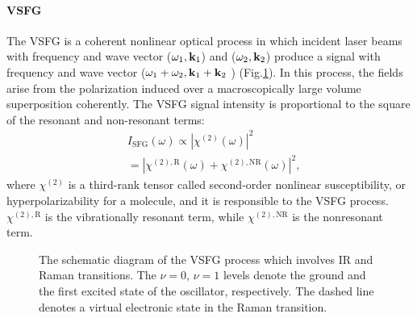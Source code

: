 \paragraph{VSFG}
The VSFG is a coherent nonlinear optical process in which incident laser beams with frequency and wave vector 
($\omega_1, {\bf k}_1$) and ($\omega_2, {\bf k}_2$) produce a signal with frequency and wave vector
($\omega_1+\omega_2, {\bf k}_1+{\bf k}_2$ ) (Fig.\thinspace\ref{fig:sfg_1a}). 
In this process, the fields arise from the polarization induced over a macroscopically large volume superposition coherently.
%
The VSFG signal intensity is proportional to the square of the resonant and non-resonant terms:
\begin{align}
  &I_{\text{SFG}}(\omega) \varpropto |\chi^{(2)}(\omega)|^2 \nonumber \\
  &=|\chi^{(2),\text{R}}(\omega)+\chi^{(2),\text{NR}}(\omega)|^2,
\label{eq:I_SFG}
\end{align}
where $\chi^{(2)}$ is a third-rank tensor called second-order nonlinear susceptibility, or hyperpolarizability for a molecule\cite{Morita2018-page2},
and it is responsible to the VSFG process. 
$\chi^{(2),\text{R}}$ is the vibrationally resonant term, while $\chi^{(2),\text{NR}}$ is the nonresonant term.
\begin{figure}[h]
\centering
{}
\caption{The schematic diagram of the VSFG process which involves IR and Raman transitions. The $\nu =0$, $\nu=1$ levels denote the ground and the first excited state of the oscillator\cite{Gang202104}, respectively.
 The dashed line denotes a virtual electronic state in the Raman transition.
}\label{fig:sfg_1a} 
\end{figure}
